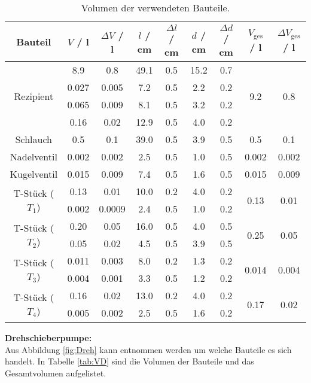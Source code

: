 \begin{table}[H] %
  \centering
  \caption{Volumen der verwendeten Bauteile.}
  \label{tab:Volumen}
  \begin{tabular}{c|c|c|c|c|c|c|c|c}
    Bauteil & $V$ / l & $\Delta V$ / l & $l$ / cm & $\Delta l$ / cm & $d$ / cm & $\Delta d$ / cm & $V_\text{ges}$ / l & $\Delta V_\text{ges}$ / l \\
    \midrule
    \multirow{4}{*}{Rezipient} & 8.9 & 0.8 & 49.1 & 0.5 & 15.2 & 0.7 & \multirow{4}{*}{9.2} & \multirow{4}{*}{0.8} \\
    & 0.027 & 0.005 & 7.2 & 0.5 & 2.2 & 0.2 & \\
    & 0.065 & 0.009 & 8.1 & 0.5 & 3.2 & 0.2 & \\
    & 0.16 & 0.02 & 12.9 & 0.5 & 4.0 & 0.2 & \\
    \hline
    Schlauch & 0.5 & 0.1 & 39.0 & 0.5 & 3.9 & 0.5 & 0.5 & 0.1 \\
    \hline
    Nadelventil & 0.002 & 0.002 & 2.5 & 0.5 & 1.0 & 0.5 & 0.002 & 0.002 \\
    \hline
    Kugelventil & 0.015 & 0.009 & 7.4 & 0.5 & 1.6 & 0.5 & 0.015 & 0.009 \\
    \hline
    \multirow{2}{*}{T-Stück ($T_1$)} & 0.13 & 0.01 & 10.0 & 0.2 & 4.0 & 0.2 & \multirow{2}{*}{0.13} & \multirow{2}{*}{0.01} \\
    & 0.002 & 0.0009 & 2.4 & 0.5 & 1.0 & 0.2 & \\
    \hline
    \multirow{2}{*}{T-Stück ($T_2$)} & 0.20 & 0.05 & 16.0 & 0.5 & 4.0 & 0.5 & \multirow{2}{*}{0.25} & \multirow{2}{*}{0.05} \\
    & 0.05 & 0.02 & 4.5 & 0.5 & 3.9 & 0.5 & \\
    \hline
    \multirow{2}{*}{T-Stück ($T_3$)} & 0.011 & 0.003 & 8.0 & 0.2 & 1.3 & 0.2 & \multirow{2}{*}{0.014} & \multirow{2}{*}{0.004} \\
    & 0.004 & 0.001 & 3.3 & 0.5 & 1.2 & 0.2 & \\
    \hline
    \multirow{2}{*}{T-Stück ($T_4$)} & 0.16 & 0.02 & 13.0 & 0.2 & 4.0 & 0.2 & \multirow{2}{*}{0.17} & \multirow{2}{*}{0.02} \\
    & 0.005 & 0.002 & 2.5 & 0.5 & 1.6 & 0.2 & \\
  \end{tabular}
\end{table}

\newpage
\textbf{Drehschieberpumpe:} \\
Aus Abbildung \eqref{fig:Dreh} kann entnommen werden um welche Bauteile es sich handelt. In Tabelle \eqref{tab:VD} sind die Volumen der Bauteile und das Gesamtvolumen aufgelistet.

